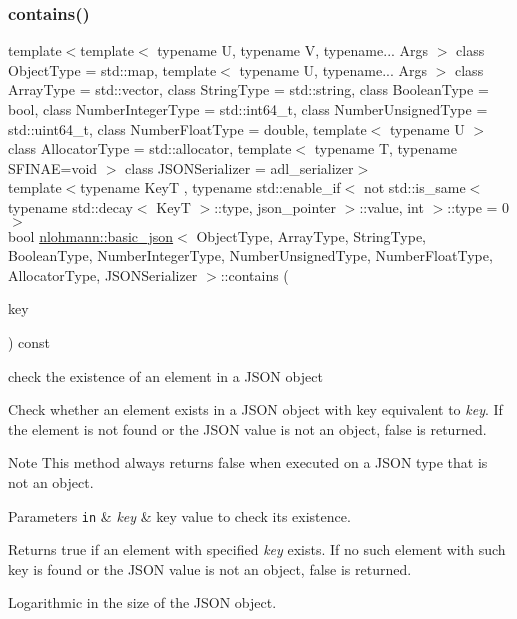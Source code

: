 \subsubsection{\texorpdfstring{contains()}{contains()}\hspace{0.1cm}{\footnotesize\ttfamily [1/2]}}
{\footnotesize\ttfamily template$<$template$<$ typename U, typename V, typename... Args $>$ class Object\+Type = std\+::map, template$<$ typename U, typename... Args $>$ class Array\+Type = std\+::vector, class String\+Type  = std\+::string, class Boolean\+Type  = bool, class Number\+Integer\+Type  = std\+::int64\+\_\+t, class Number\+Unsigned\+Type  = std\+::uint64\+\_\+t, class Number\+Float\+Type  = double, template$<$ typename U $>$ class Allocator\+Type = std\+::allocator, template$<$ typename T, typename S\+F\+I\+N\+A\+E=void $>$ class J\+S\+O\+N\+Serializer = adl\+\_\+serializer$>$ \\
template$<$typename KeyT , typename std\+::enable\+\_\+if$<$ not std\+::is\+\_\+same$<$ typename std\+::decay$<$ Key\+T $>$\+::type, json\+\_\+pointer $>$\+::value, int $>$\+::type  = 0$>$ \\
bool \mbox{\hyperlink{classnlohmann_1_1basic__json}{nlohmann\+::basic\+\_\+json}}$<$ Object\+Type, Array\+Type, String\+Type, Boolean\+Type, Number\+Integer\+Type, Number\+Unsigned\+Type, Number\+Float\+Type, Allocator\+Type, J\+S\+O\+N\+Serializer $>$\+::contains (\begin{DoxyParamCaption}\item[{KeyT \&\&}]{key }\end{DoxyParamCaption}) const\hspace{0.3cm}{\ttfamily [inline]}}



check the existence of an element in a J\+S\+ON object 

Check whether an element exists in a J\+S\+ON object with key equivalent to {\itshape key}. If the element is not found or the J\+S\+ON value is not an object, false is returned.

\begin{DoxyNote}{Note}
This method always returns false when executed on a J\+S\+ON type that is not an object.
\end{DoxyNote}

\begin{DoxyParams}[1]{Parameters}
\mbox{\tt in}  & {\em key} & key value to check its existence.\\
\hline
\end{DoxyParams}
\begin{DoxyReturn}{Returns}
true if an element with specified {\itshape key} exists. If no such element with such key is found or the J\+S\+ON value is not an object, false is returned.
\end{DoxyReturn}
Logarithmic in the size of the J\+S\+ON object.

